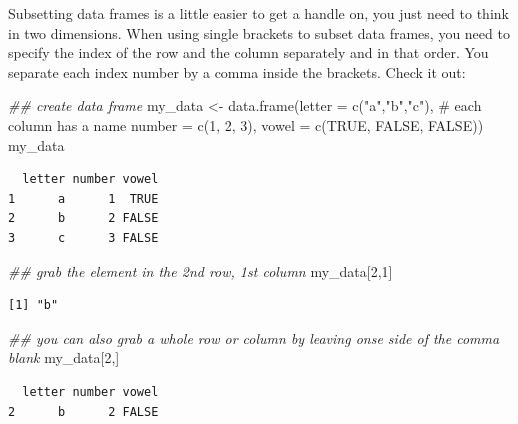 \documentclass[
  letterpaper,
  DIV=11,
  numbers=noendperiod]{scrreprt}
\newenvironment{Shaded}{\begin{snugshade}}{\end{snugshade}}
\newcommand{\AttributeTok}[1]{\textcolor[rgb]{0.40,0.45,0.13}{#1}}
\newcommand{\CommentTok}[1]{\textcolor[rgb]{0.37,0.37,0.37}{#1}}
\newcommand{\ConstantTok}[1]{\textcolor[rgb]{0.56,0.35,0.01}{#1}}
\newcommand{\DecValTok}[1]{\textcolor[rgb]{0.68,0.00,0.00}{#1}}
\newcommand{\DocumentationTok}[1]{\textcolor[rgb]{0.37,0.37,0.37}{\textit{#1}}}
\newcommand{\FunctionTok}[1]{\textcolor[rgb]{0.28,0.35,0.67}{#1}}
\newcommand{\NormalTok}[1]{\textcolor[rgb]{0.00,0.23,0.31}{#1}}
\newcommand{\OtherTok}[1]{\textcolor[rgb]{0.00,0.23,0.31}{#1}}
\newcommand{\StringTok}[1]{\textcolor[rgb]{0.13,0.47,0.30}{#1}}
\begin{document}
Subsetting data frames is a little easier to get a handle on, you just
need to think in two dimensions. When using single brackets to subset
data frames, you need to specify the index of the row and the column
separately and in that order. You separate each index number by a comma
inside the brackets. Check it out:

\begin{Shaded}
\begin{Highlighting}[]
\DocumentationTok{\#\# create data frame}
\NormalTok{my\_data }\OtherTok{\textless{}{-}} \FunctionTok{data.frame}\NormalTok{(}\AttributeTok{letter =} \FunctionTok{c}\NormalTok{(}\StringTok{"a"}\NormalTok{,}\StringTok{"b"}\NormalTok{,}\StringTok{"c"}\NormalTok{), }\CommentTok{\# each column has a name}
                      \AttributeTok{number =} \FunctionTok{c}\NormalTok{(}\DecValTok{1}\NormalTok{, }\DecValTok{2}\NormalTok{, }\DecValTok{3}\NormalTok{),}
                      \AttributeTok{vowel =} \FunctionTok{c}\NormalTok{(}\ConstantTok{TRUE}\NormalTok{, }\ConstantTok{FALSE}\NormalTok{, }\ConstantTok{FALSE}\NormalTok{))}
\NormalTok{my\_data}
\end{Highlighting}
\end{Shaded}

\begin{verbatim}
  letter number vowel
1      a      1  TRUE
2      b      2 FALSE
3      c      3 FALSE
\end{verbatim}

\begin{Shaded}
\begin{Highlighting}[]
\DocumentationTok{\#\# grab the element in the 2nd row, 1st column}
\NormalTok{my\_data[}\DecValTok{2}\NormalTok{,}\DecValTok{1}\NormalTok{]}
\end{Highlighting}
\end{Shaded}

\begin{verbatim}
[1] "b"
\end{verbatim}

\begin{Shaded}
\begin{Highlighting}[]
\DocumentationTok{\#\# you can also grab a whole row or column by leaving onse side of the comma blank}
\NormalTok{my\_data[}\DecValTok{2}\NormalTok{,]}
\end{Highlighting}
\end{Shaded}

\begin{verbatim}
  letter number vowel
2      b      2 FALSE
\end{verbatim}
\end{document}
